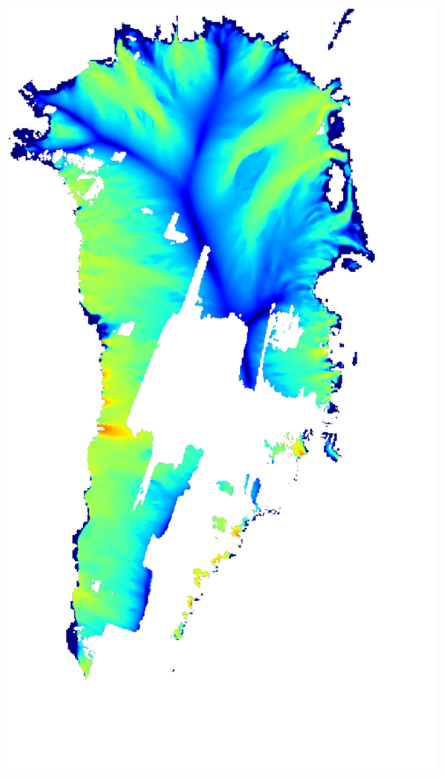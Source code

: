 \documentclass{beamer}
\begin{document}
\begin{frame}
\begin{columns}
\begin{column}{0.33\textwidth}
\begin{center}
  \includegraphics[width=0.85\textwidth]{g3km_3_25_99}
\end{center}
\end{column}
\end{columns}
\end{frame}
\end{document}
